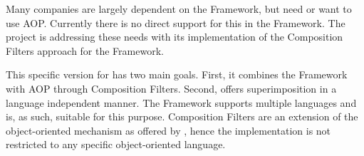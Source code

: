 Many companies are largely dependent on the \dotNET Framework, but need or want to use AOP. Currently there is no direct support for this in the Framework. The \Compose*[.NET] project is addressing these needs with its implementation of the Composition Filters approach for the \dotNET Framework.

This specific \Compose* version for \dotNET has two main goals.
First, it combines the \dotNET Framework with AOP through Composition Filters.
Second, \Compose* offers superimposition in a language independent manner. The \dotNET Framework supports multiple languages and is, as such, suitable for this purpose.
Composition Filters are an extension of the object-oriented mechanism as offered by \dotNET, hence the implementation is not restricted to any specific object-oriented language.






